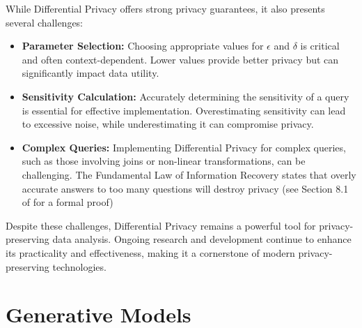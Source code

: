 While Differential Privacy offers strong privacy guarantees, it also presents several challenges:

\begin{itemize}
    \item \textbf{Parameter Selection:} Choosing appropriate values for $\epsilon$ and $\delta$ is critical and often context-dependent. Lower values provide better privacy but can significantly impact data utility.
    \item \textbf{Sensitivity Calculation:} Accurately determining the sensitivity of a query is essential for effective implementation. Overestimating sensitivity can lead to excessive noise, while underestimating it can compromise privacy.
    \item \textbf{Complex Queries:} Implementing Differential Privacy for complex queries, such as those involving joins or non-linear transformations, can be challenging. The Fundamental Law of Information Recovery states that overly accurate answers to too many questions will destroy privacy (see Section 8.1 of \cite{dwork2013} for a formal proof)
\end{itemize}

Despite these challenges, Differential Privacy remains a powerful tool for privacy-preserving data analysis. Ongoing research and development continue to enhance its practicality and effectiveness, making it a cornerstone of modern privacy-preserving technologies.




\section{Generative Models}

